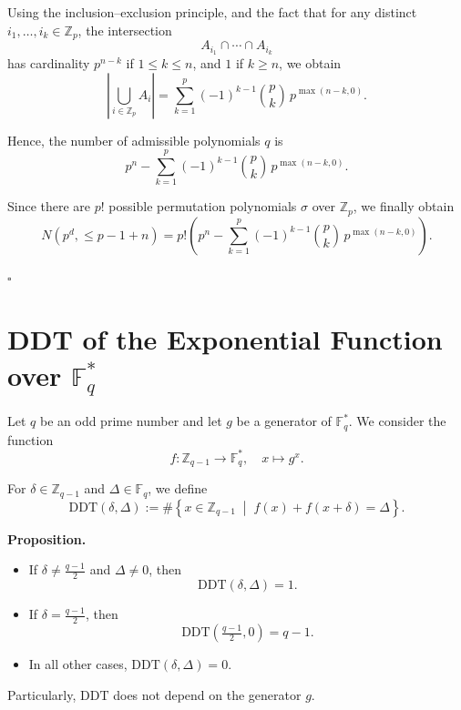 \documentclass{article}
\begin{document}
\vspace{0.2cm}

Using the inclusion--exclusion principle, and the fact that for any distinct 
$i_1,\dots,i_k \in \mathbb{Z}_p$, the intersection
\[
A_{i_1} \cap \cdots \cap A_{i_k}
\]
has cardinality $p^{n-k}$ if $1 \leq k \leq n$, and $1$ if $k \geq n$, we obtain
\[
\left|\bigcup_{i \in \mathbb{Z}_p} A_i\right|
= \sum_{k=1}^{p} (-1)^{k-1} \binom{p}{k} \, p^{\max(n-k,0)}.
\]

\vspace{0.2cm}

Hence, the number of admissible polynomials $q$ is
\[
p^n - \sum_{k=1}^{p} (-1)^{k-1} \binom{p}{k} \, p^{\max(n-k,0)}.
\]

\vspace{0.2cm}

Since there are $p!$ possible permutation polynomials $\sigma$ over $\mathbb{Z}_p$, we finally obtain
\[
N(p^d,\leq p-1+n)
= p! \left( 
p^n - \sum_{k=1}^{p} (-1)^{k-1} \binom{p}{k} \, p^{\max(n-k,0)}
\right).
\]

\hfill $\square$

\section{DDT of the Exponential Function over $\mathbb{F}_q^*$}

Let $q$ be an odd prime number and let $g$ be a generator of $\mathbb{F}_q^*$. 
We consider the function
\[
f : \mathbb{Z}_{q-1} \to \mathbb{F}_q^*, \quad x \mapsto g^x.
\]

For $\delta \in \mathbb{Z}_{q-1}$ and $\Delta \in \mathbb{F}_q$, we define
\[
\mathrm{DDT}(\delta, \Delta) := \# \left\{ x \in \mathbb{Z}_{q-1} \;\middle|\; f(x) + f(x+\delta) = \Delta \right\}.
\]

\medskip

\textbf{Proposition.}
\begin{itemize}
    \item If $\delta \neq \frac{q-1}{2}$ and $\Delta \neq 0$, then 
    \[
    \mathrm{DDT}(\delta, \Delta) = 1.
    \]
    \item If $\delta = \frac{q-1}{2}$, then 
    \[
    \mathrm{DDT}\!\left(\tfrac{q-1}{2}, 0\right) = q-1.
    \]
    \item In all other cases, $\mathrm{DDT}(\delta, \Delta) = 0$.
\end{itemize}

Particularly, $\mathrm{DDT}$ does not depend on the generator $g$.
\end{document}
